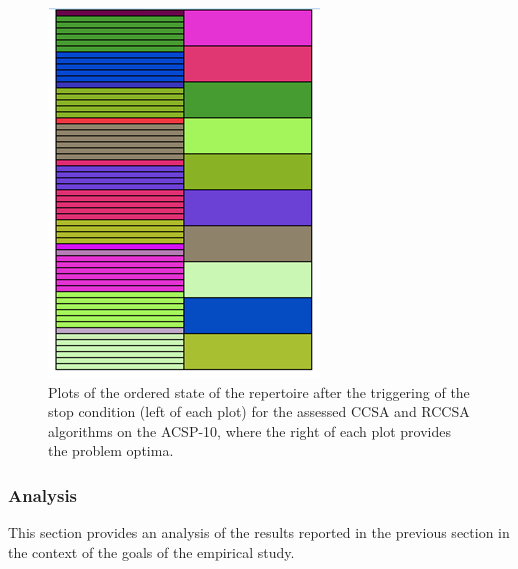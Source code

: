 \begin{figure}[htp]
{\begin{minipage}[t]{\textwidth}
		\centering \includegraphics[scale=0.45]{Cells/RCCSA-H-ES-plot}
	\end{minipage}}	
	\caption{Plots of the ordered state of the repertoire after the triggering of the stop condition (left of each plot) for the assessed CCSA and RCCSA algorithms on the ACSP-10, where the right of each plot provides the problem optima.}
	\label{fig:cells:ccsa:rccsa:plots} %
\end{figure}


%
%
\subsubsection{Analysis}
This section provides an analysis of the results reported in the previous section in the context of the goals of the empirical study. 

%
%
